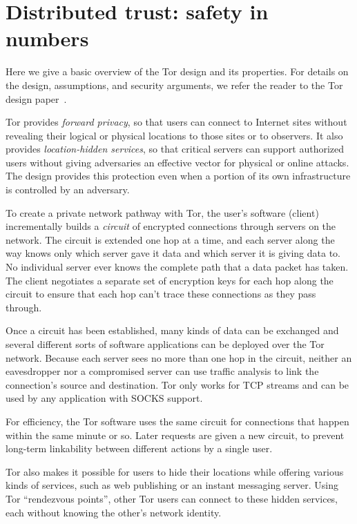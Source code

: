 \documentclass{llncs}
\begin{document}
\section{Distributed trust: safety in numbers}
\label{sec:what-is-tor}

Here we give a basic overview of the Tor design and its properties. For
details on the design, assumptions, and security arguments, we refer
the reader to the Tor design paper~\cite{tor-design}.

Tor provides \emph{forward privacy}, so that users can connect to
Internet sites without revealing their logical or physical locations
to those sites or to observers.  It also provides \emph{location-hidden
services}, so that critical servers can support authorized users without
giving adversaries an effective vector for physical or online attacks.
The design provides this protection even when a portion of its own
infrastructure is controlled by an adversary.

To create a private network pathway with Tor, the user's software (client)
incrementally builds a \emph{circuit} of encrypted connections through
servers on the network. The circuit is extended one hop at a time, and
each server along the way knows only which server gave it data and which
server it is giving data to. No individual server ever knows the complete
path that a data packet has taken. The client negotiates a separate set
of encryption keys for each hop along the circuit to ensure that each
hop can't trace these connections as they pass through.

Once a circuit has been established, many kinds of data can be exchanged
and several different sorts of software applications can be deployed over
the Tor network. Because each server sees no more than one hop in the
circuit, neither an eavesdropper nor a compromised server can use traffic
analysis to link the connection's source and destination. Tor only works
for TCP streams and can be used by any application with SOCKS support.

For efficiency, the Tor software uses the same circuit for connections
that happen within the same minute or so. Later requests are given a new
circuit, to prevent long-term linkability between different actions by
a single user.

Tor also makes it possible for users to hide their locations while
offering various kinds of services, such as web publishing or an instant
messaging server. Using Tor ``rendezvous points'', other Tor users can
connect to these hidden services, each without knowing the other's network
identity.
\end{document}
